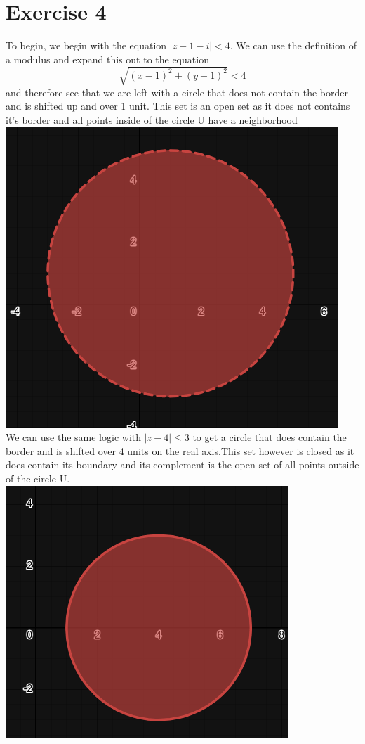 \documentclass[notitlepage]{article}
\begin{document}
\section*{Exercise 4}

    \hspace{1cm} To begin, we begin with the equation $\left| z - 1 - i \right| < 4$. We can use
    the definition of a modulus and expand this out to the equation $$\sqrt{(x-1)^2+(y-1)^2} < 4$$
    and therefore see that we are left with a circle that does not contain the border and is shifted 
    up and over 1 unit. This set is an open set as it does not contains it's border and all points
    inside of the circle U have a neighborhood\\
\includegraphics[scale=0.5]{hw1_4_1.png} \\
    We can use the same logic with $| z- 4 | \leq 3$ to get a circle that does contain the border and 
    is shifted over 4 units on the real axis.This set however is closed as it does contain its boundary
    and its complement is the open set of all points outside of the circle U.\\
\includegraphics[scale=0.6]{hw1_4_2} \\
\end{document}
